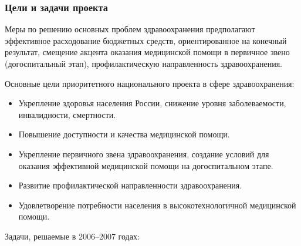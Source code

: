\documentclass[article, 12pt, russian, oneside]{ncc}
\begin{document}
\subsubsection{Цели и задачи проекта}

Меры по решению основных проблем здравоохранения предполагают
эффективное расходование бюджетных средств, ориентированное на
конечный результат, смещение акцента оказания медицинской помощи в
первичное звено (догоспитальный этап), профилактическую направленность
здравоохранения.

Основные цели приоритетного национального проекта в сфере
здравоохранения:

\begin{itemize}
\item Укрепление здоровья населения России, снижение уровня
  заболеваемости, инвалидности, смертности.
\item Повышение доступности и качества медицинской помощи.
\item Укрепление первичного звена здравоохранения, создание условий
  для оказания эффективной медицинской помощи на догоспитальном этапе.
\item Развитие профилактической направленности здравоохранения.
\item Удовлетворение потребности населения в высокотехнологичной
  медицинской помощи.
\end{itemize}

Задачи, решаемые в 2006--2007 годах:
\end{document}
